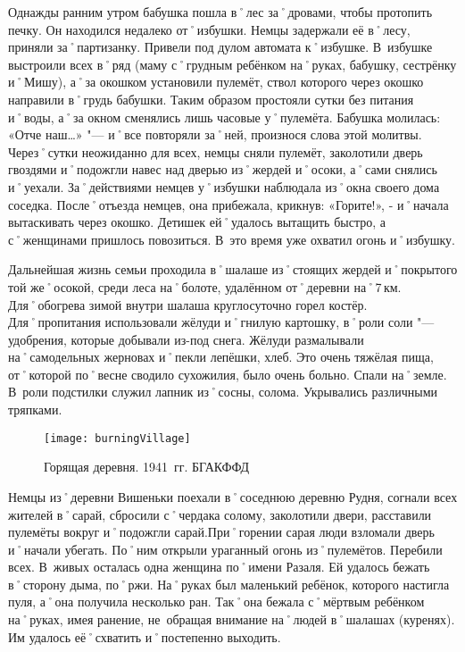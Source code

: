 Однажды ранним утром бабушка пошла в˚лес за˚дровами, чтобы протопить печку. Он находился недалеко от˚избушки. Немцы задержали её в˚лесу, приняли за˚партизанку. Привели под дулом автомата к˚избушке. В~избушке выстроили всех в˚ряд (маму с˚грудным ребёнком на˚руках, бабушку, сестрёнку и˚Мишу), а˚за окошком установили пулемёт, ствол которого через окошко направили в˚грудь бабушки. Таким образом простояли сутки без питания и˚воды, а˚за окном сменялись лишь часовые у˚пулемёта. Бабушка молилась: «Отче наш…» "--- и˚все повторяли за˚ней, произнося слова этой молитвы. Через˚сутки неожиданно для всех, немцы сняли пулемёт, заколотили дверь гвоздями и˚подожгли навес над дверью из˚жердей и˚осоки, а˚сами снялись и˚уехали. За˚действиями немцев у˚избушки наблюдала из˚окна своего дома соседка. После˚отъезда немцев, она прибежала, крикнув: «Горите!», - и˚начала вытаскивать через окошко. Детишек ей˚удалось вытащить быстро, а с˚женщинами пришлось повозиться. В~это время уже охватил огонь и˚избушку.

Дальнейшая жизнь семьи проходила в˚шалаше из˚стоящих жердей и˚покрытого той же˚осокой, среди леса на˚болоте, удалённом от˚деревни на˚7\,км. Для˚обогрева зимой внутри шалаша круглосуточно горел костёр. Для˚пропитания использовали жёлуди и˚гнилую картошку, в˚роли соли "--- удобрения, которые добывали из-под снега. Жёлуди размалывали на˚самодельных жерновах и˚пекли лепёшки, хлеб. Это очень тяжёлая пища, от˚которой по˚весне сводило сухожилия, было очень больно. Спали на˚земле. В~роли подстилки служил лапник из˚сосны, солома. Укрывались различными тряпками.


\begin{wrapfigure}{O}{.4\textwidth}
\centering
\texttt{[image: burningVillage]}
\caption[Горящая деревня. 1941~гг. БГАКФФД]{Горящая деревня. 1941~гг. БГАКФФД\footnotemark}
\label{fig:burningVillage}
\end{wrapfigure}

Немцы из˚деревни Вишеньки поехали в˚соседнюю деревню Рудня, согнали всех жителей в˚сарай, сбросили с˚чердака солому, заколотили двери, расставили пулемёты вокруг и˚подожгли сарай.При˚горении сарая люди взломали дверь и˚начали убегать. По˚ним открыли ураганный огонь из˚пулемётов. Перебили всех. В~живых осталась одна женщина по˚имени Разаля. Ей удалось бежать в˚сторону дыма, по˚ржи. На˚руках был маленький ребёнок, которого настигла пуля, а˚она получила несколько ран. Так˚она бежала с˚мёртвым ребёнком на˚руках, имея ранение, не~обращая внимание на˚людей в˚шалашах (куренях). Им удалось её˚схватить и˚постепенно выходить. 


